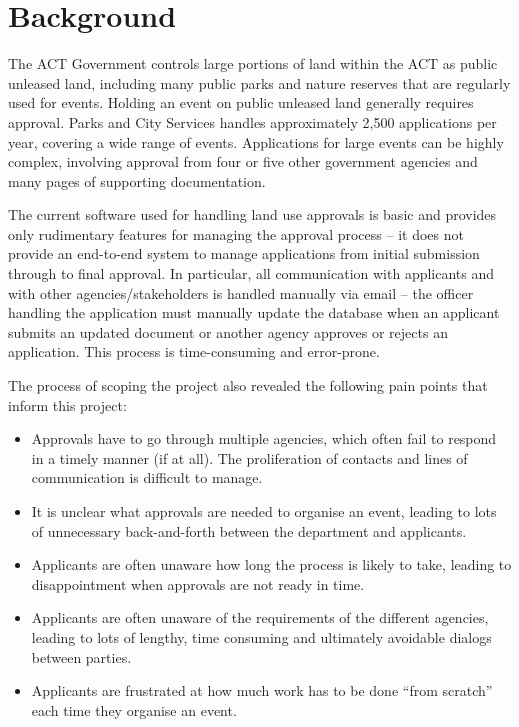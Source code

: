 \documentclass[12pt,a4paper,twosided]{article}
\begin{document}
\section{Background}

The ACT Government controls large portions of land within the ACT as
public unleased land, including many public parks and nature reserves
that are regularly used for events. Holding an event on public unleased
land generally requires approval. Parks and City Services handles
approximately 2,500 applications per year, covering a wide range of
events. Applications for large events can be highly complex, involving
approval from four or five other government agencies and many pages of
supporting documentation.

The current software used for handling land use approvals is basic and
provides only rudimentary features for managing the approval process --
it does not provide an end-to-end system to manage applications from
initial submission through to final approval. In particular, all
communication with applicants and with other agencies/stakeholders is
handled manually via email -- the officer handling the application must
manually update the database when an applicant submits an updated
document or another agency approves or rejects an application. This
process is time-consuming and error-prone.

The process of scoping the project also revealed the following pain
points that inform this project:

\begin{itemize}
\itemsep1pt\parskip0pt
\item
  Approvals have to go through multiple agencies, which often fail to
  respond in a timely manner (if at all). The proliferation of contacts
  and lines of communication is difficult to manage.
\item
  It is unclear what approvals are needed to organise an event, leading
  to lots of unnecessary back-and-forth between the department and
  applicants.
\item
  Applicants are often unaware how long the process is likely to take,
  leading to disappointment when approvals are not ready in time.
\item
  Applicants are often unaware of the requirements of the different
  agencies, leading to lots of lengthy, time consuming and ultimately
  avoidable dialogs between parties.
\item
  Applicants are frustrated at how much work has to be done ``from
  scratch'' each time they organise an event.
\end{itemize}
\end{document}
